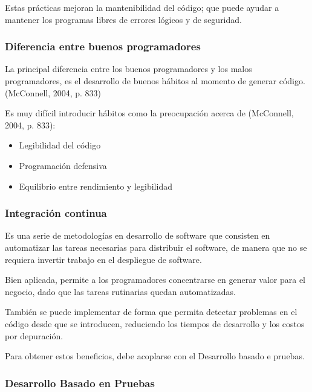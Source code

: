 \documentclass[
  12,
]{scrartcl}
\providecommand{\tightlist}{%
  \setlength{\itemsep}{0pt}\setlength{\parskip}{0pt}}
\begin{document}
Estas prácticas mejoran la mantenibilidad del código; que puede ayudar a
mantener los programas libres de errores lógicos y de seguridad.

\hypertarget{diferencia-entre-buenos-programadores}{%
\subsubsection{Diferencia entre buenos
programadores}\label{diferencia-entre-buenos-programadores}}

La principal diferencia entre los buenos programadores y los malos
programadores, es el desarrollo de buenos hábitos al momento de generar
código. (McConnell, 2004, p. 833)

Es muy difícil introducir hábitos como la preocupación acerca de
(McConnell, 2004, p. 833):

\begin{itemize}
\tightlist
\item
  Legibilidad del código
\item
  Programación defensiva
\item
  Equilibrio entre rendimiento y legibilidad
\end{itemize}

\hypertarget{integraciuxf3n-continua}{%
\subsubsection{Integración continua}\label{integraciuxf3n-continua}}

Es una serie de metodologías en desarrollo de software que consisten en
automatizar las tareas necesarias para distribuir el software, de manera
que no se requiera invertir trabajo en el despliegue de software.

Bien aplicada, permite a los programadores concentrarse en generar valor
para el negocio, dado que las tareas rutinarias quedan automatizadas.

También se puede implementar de forma que permita detectar problemas en
el código desde que se introducen, reduciendo los tiempos de desarrollo
y los costos por depuración.

Para obtener estos beneficios, debe acoplarse con el Desarrollo basado e
pruebas.

\hypertarget{desarrollo-basado-en-pruebas}{%
\subsubsection{Desarrollo Basado en
Pruebas}\label{desarrollo-basado-en-pruebas}}
\end{document}
